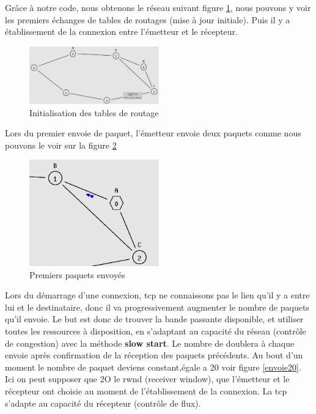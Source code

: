 \documentclass[11pt]{article}
\begin{document}
Grâce à notre code, nous obtenons le réseau suivant figure \ref{miseAjourRoutageTCPDV}, nous pouvons y voir les premiers échanges de tables de routages (mise à jour initiale). Puis il y a établissement de la connexion entre l’émetteur et le récepteur.


\begin{figure}[H]
	\begin{center}
		\includegraphics[width=0.5\textwidth]{assets/tp2/miseAjourRoutage.png}
	\end{center}
	\caption{Initialisation des tables de routage}
	\label{miseAjourRoutageTCPDV}
\end{figure}

Lors du premier envoie de paquet, l’émetteur envoie deux paquets comme nous pouvons le voir sur la figure \ref{premPaquet}

\begin{figure}[H]
	\begin{center}
		\includegraphics[width=0.5\textwidth]{assets/tp2/premierEvoiepaquet.png}
	\end{center}
	\caption{Premiers paquets envoyés}
	\label{premPaquet}
\end{figure}


Lors du démarrage d'une connexion, tcp ne connaissons pas le lien qu'il y a entre lui et le destinataire, donc il va progressivement augmenter le nombre de paquets qu'il envoie. Le but est donc de trouver la bande passante disponible, et utiliser toutes les ressources à disposition, en s'adaptant au capacité du réseau (contrôle de congestion) avec la méthode \textbf{slow start}. Le nombre de doublera à chaque envoie après confirmation de la réception des paquets précédents. Au bout d'un moment le nombre de paquet deviens constant,égale a 20 voir figure \ref{envoie20}. Ici on peut supposer que 2O le rwnd (receiver window), que l'émetteur et le récepteur ont choisie au moment de l’établissement de la connexion. La tcp s'adapte au capacité du récepteur (contrôle de flux).
\end{document}
